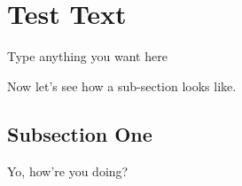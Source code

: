 
\section{Test Text}
\label{sec:text}

Type anything you want here

Now let's see how a sub-section looks like.

\subsection{Subsection One}

Yo, how're you doing?



 

